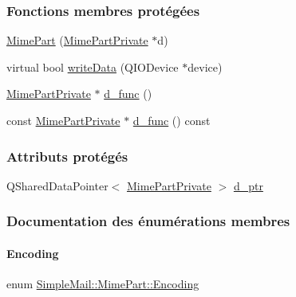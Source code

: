\subsubsection*{Fonctions membres protégées}
\begin{DoxyCompactItemize}
\item 
\hyperlink{class_simple_mail_1_1_mime_part_a7b947f679571a86c16fa7015971c1524}{Mime\+Part} (\hyperlink{class_simple_mail_1_1_mime_part_private}{Mime\+Part\+Private} $\ast$d)
\item 
virtual bool \hyperlink{class_simple_mail_1_1_mime_part_ab8b85a3cf47e6bd8d2051dfa5c56c36a}{write\+Data} (Q\+I\+O\+Device $\ast$device)
\item 
\hyperlink{class_simple_mail_1_1_mime_part_private}{Mime\+Part\+Private} $\ast$ \hyperlink{class_simple_mail_1_1_mime_part_aae9030aebac36f316718eeea6afc5971}{d\+\_\+func} ()
\item 
const \hyperlink{class_simple_mail_1_1_mime_part_private}{Mime\+Part\+Private} $\ast$ \hyperlink{class_simple_mail_1_1_mime_part_a5ae5c144f7a80afd6b5ef36512baf67a}{d\+\_\+func} () const
\end{DoxyCompactItemize}
\subsubsection*{Attributs protégés}
\begin{DoxyCompactItemize}
\item 
Q\+Shared\+Data\+Pointer$<$ \hyperlink{class_simple_mail_1_1_mime_part_private}{Mime\+Part\+Private} $>$ \hyperlink{class_simple_mail_1_1_mime_part_a6adc00256ce96a9282f2ec0224625b0b}{d\+\_\+ptr}
\end{DoxyCompactItemize}


\subsubsection{Documentation des énumérations membres}
\mbox{\label{class_simple_mail_1_1_mime_part_ae67a2f5406958b95b18bf31a7bbeb5c9}} 
\paragraph{\texorpdfstring{Encoding}{Encoding}}
{\footnotesize\ttfamily enum \hyperlink{class_simple_mail_1_1_mime_part_ae67a2f5406958b95b18bf31a7bbeb5c9}{Simple\+Mail\+::\+Mime\+Part\+::\+Encoding}}


